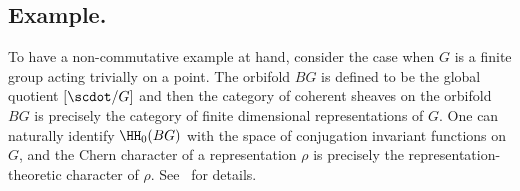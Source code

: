  \subsection{Example.}  To have a non-commutative example at
hand, consider the case when $G$ is a finite group acting trivially
on a point.  The orbifold $BG$ is defined to be the global quotient $[\scdot/G]$ and then the category of coherent sheaves on the
orbifold $BG$ is precisely the category of finite
dimensional representations of $G$.  One can naturally identify
$\HH_0(BG)$ with the space of conjugation invariant functions on $G$,
and the Chern character of a representation $\rho$ is precisely the
representation-theoretic character of $\rho$.
See~\cite{WilGr} for details.
